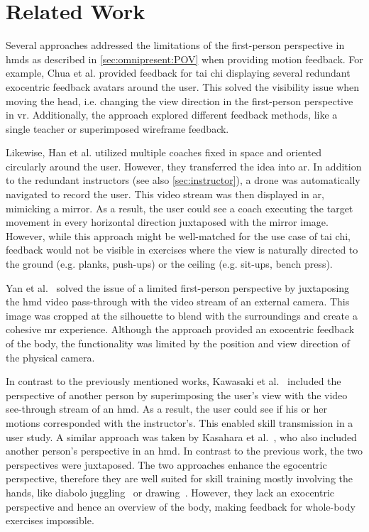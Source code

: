 \section{Related Work}
Several approaches addressed the limitations of the first-person perspective in \acrshort{hmd}s as described in \autoref{sec:omnipresent:POV} when providing motion feedback. For example, Chua et al. \cite{chua2003tpt} provided feedback for tai chi displaying several redundant exocentric feedback avatars around the user. This solved the visibility issue when moving the head, i.e. changing the view direction in the first-person perspective in \acrshort{vr}. Additionally, the approach explored different feedback methods, like a single teacher or superimposed wireframe feedback.

Likewise, Han et al. \cite{han2017mtc} utilized multiple coaches fixed in space and oriented circularly around the user. However, they transferred the idea into \acrshort{ar}. In addition to the redundant instructors (see also \autoref{sec:instructor}), a drone was automatically navigated to record the user. This video stream was then displayed in \acrshort{ar}, mimicking a mirror. As a result, the user could see a coach executing the target movement in every horizontal direction juxtaposed with the mirror image. However, while this approach might be well-matched for the use case of tai chi, feedback would not be visible in exercises where the view is naturally directed to the ground (e.g. planks, push-ups) or the ceiling (e.g. sit-ups, bench press).

Yan et al.~\cite{Yan2015oma} solved the issue of a limited first-person perspective by juxtaposing the \acrshort{hmd} video pass-through with the video stream of an external camera. This image was cropped at the silhouette to blend with the surroundings and create a cohesive \acrshort{mr} experience. Although the approach provided an exocentric feedback of the body, the functionality was limited by the position and view direction of the physical camera.

In contrast to the previously mentioned works, Kawasaki et al.~\cite{kawasaki2010cst} included the perspective of another person by superimposing the user's view with the video see-through stream of an \acrshort{hmd}. As a result, the user could see if his or her motions corresponded with the instructor's. This enabled skill transmission in a user study. A similar approach was taken by Kasahara et al.~\cite{kasahara2016pe}, who also included another person's perspective in an \acrshort{hmd}. In contrast to the previous work, the two perspectives were juxtaposed. The two approaches enhance the egocentric perspective, therefore they are well suited for skill training mostly involving the hands, like diabolo juggling~\cite{kawasaki2010cst} or drawing~\cite{kasahara2016pe}. However, they lack an exocentric perspective and hence an overview of the body, making feedback for whole-body exercises impossible.



